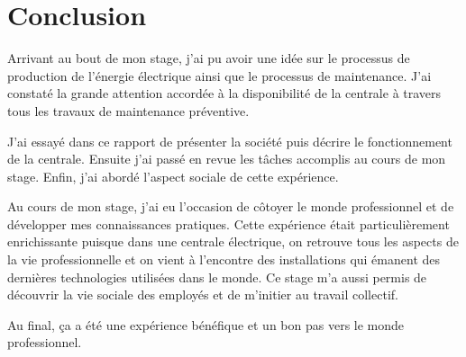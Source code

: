 \chapter*{Conclusion}
Arrivant au bout de mon stage, j'ai pu avoir une idée sur le processus de production de l'énergie électrique ainsi que le processus de maintenance. 
 J'ai constaté la grande attention accordée à la disponibilité de la centrale à travers tous les travaux de maintenance préventive.

J'ai essayé dans ce rapport de présenter la société puis décrire le fonctionnement de la centrale. Ensuite j'ai passé en revue les tâches accomplis au cours de mon stage. Enfin, j'ai abordé l'aspect sociale de cette expérience.


Au cours de mon stage, j'ai eu l'occasion de côtoyer le monde professionnel et de développer mes connaissances pratiques. Cette  expérience était particulièrement enrichissante puisque dans une centrale électrique, on retrouve tous les aspects de la vie professionnelle et on vient  à l'encontre  des installations qui émanent des dernières technologies utilisées  dans le monde. Ce  stage m'a aussi permis de découvrir la vie sociale des employés et de m'initier au travail collectif.


Au final, ça a été une expérience bénéfique et un bon pas vers le monde professionnel.

